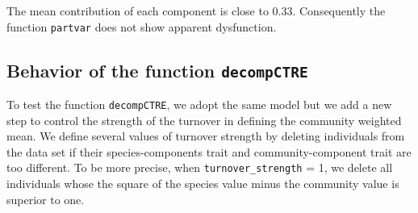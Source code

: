 \documentclass[12pt]{article}\usepackage[]{graphicx}\usepackage[]{color}
\begin{document}
The mean contribution of each component is close to 0.33. Consequently the function \texttt{partvar} does not show apparent dysfunction.

\subsection{Behavior of the function \texttt{decompCTRE}}

To test the function \texttt{decompCTRE}, we adopt the same model but we add a new step to control the strength of the turnover in defining the community weighted mean.
We define several values of turnover strength by deleting individuals from the data set if their species-components trait and community-component trait are too different. To be more precise, when \texttt{turnover\_strength} = 1, we delete all individuals whose the square of the species value minus the community value is superior to one. 
\end{document}
